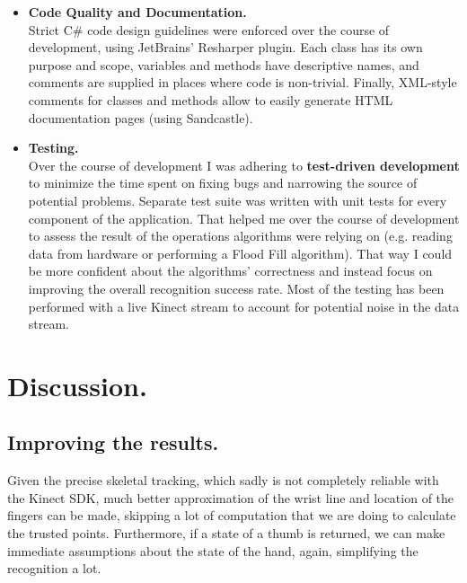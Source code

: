 \documentclass[a4paper,11pt,oneside]{article}
\begin{document}
\begin{itemize}
  \item \textbf{Code Quality and Documentation.} \\
Strict C\# code design guidelines were enforced over the course of development, using JetBrains' Resharper plugin. Each class has its own  purpose and scope, variables and methods have descriptive names, and comments are supplied in places where code is non-trivial. Finally, XML-style comments for classes and methods allow to easily generate HTML documentation pages (using Sandcastle).

  \item \textbf{Testing.}\\ 
Over the course of development I was adhering to \textbf{test-driven development} to minimize the time spent on fixing bugs and narrowing the source of potential problems. Separate test suite was written with unit tests for every component of the application. That helped me over the course of development to assess the result of the operations algorithms were relying on (e.g. reading data from hardware or performing a Flood Fill algorithm). That way I could be more confident about the algorithms' correctness and instead focus on improving the overall recognition success rate. Most of the testing has been performed with a live Kinect stream to account for potential noise in the data stream.

  \end{itemize}

\section{Discussion.}

\subsection{Improving the results.}
Given the precise skeletal tracking, which sadly is not completely reliable with the Kinect SDK, much better approximation of the wrist line and location of the fingers can be made, skipping a lot of computation that we are doing to calculate the trusted points. Furthermore, if a state of a thumb is returned, we can make immediate assumptions about the state of the hand, again, simplifying the recognition a lot.

\end{document}
